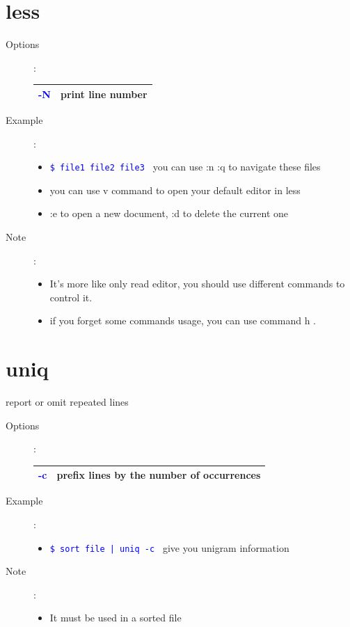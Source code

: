 \documentclass[a4paper,12pt,twoside]{book}
\newcommand{\linuxcommand}[1]{\texttt{\textcolor{blue}{\$ #1 \Pisymbol{psy}{191}}}}
\newcommand{\op}[1]{\textcolor{blue}{-#1}}
\begin{document}
\begin{CJK*}{UTF8}{song}
\section{less}
	\begin{description}
	\item[Options]: \\
		\begin{tabular}{c|p{}}
		\hline
		\op{N} & print line number \\
		\hline
		\end{tabular}
	\item[Example]:
		\begin{itemize}
		\item \linuxcommand{file1 file2 file3} you can use :n :q to navigate these files
		\item you can use v command to open your default editor in less
		\item :e to open a new document, :d to delete the current one
		\end{itemize}
	\item[Note]:
		\begin{itemize}
		\item It's more like only read editor, you should use different commands to control it.
		\item if you forget some commands usage, you can use command h .
		\end{itemize}
	\end{description}
\section{uniq}
	report or omit repeated lines
	\begin{description}
	\item[Options]: \\
		\begin{tabular}{c|p{}}
		\hline
		\op{c} & prefix lines by the number of occurrences \\
		\hline
		\end{tabular}
	\item[Example]:
		\begin{itemize}
		\item \linuxcommand{sort file | uniq -c } give you unigram information
		\end{itemize}
	\item[Note]:
		\begin{itemize}
		\item It must be used in a sorted file
		\end{itemize}
	\end{description}

\end{CJK*}
\end{document}
